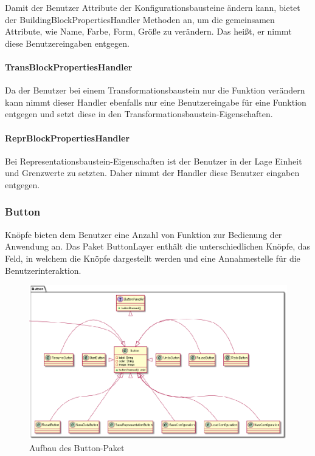 \documentclass[parskip=full]{scrartcl}
\begin{document}
Damit der Benutzer Attribute der Konfigurationsbausteine ändern kann, bietet der BuildingBlockPropertiesHandler Methoden an, um die gemeinsamen Attribute, wie Name, Farbe, Form, Größe zu verändern. Das heißt, er nimmt diese Benutzereingaben entgegen.

\paragraph{TransBlockPropertiesHandler}

Da der Benutzer bei einem Transformationsbaustein nur die Funktion verändern kann nimmt dieser Handler ebenfalls nur eine Benutzereingabe für eine Funktion entgegen und setzt diese in den Transformationsbaustein-Eigenschaften.

\paragraph{ReprBlockPropertiesHandler}

Bei Representationsbaustein-Eigenschaften ist der Benutzer in der Lage Einheit und Grenzwerte zu setzten. Daher nimmt der Handler diese Benutzer eingaben entgegen.


\newpage

\subsubsection{Button}

Knöpfe bieten dem Benutzer eine Anzahl von Funktion zur Bedienung der Anwendung an. Das Paket ButtonLayer enthält die unterschiedlichen Knöpfe, das Feld, in welchem die Knöpfe dargestellt werden und eine Annahmestelle für die Benutzerinteraktion.

\begin{figure}[htbp]
	\begin{center}
		\includegraphics[width = 14cm]{Grafiken/View/ButtonNamespace.png}
		\caption{Aufbau des Button-Paket}
		\label{Entwurf_Grob}
	\end{center}
\end{figure}
\end{document}
